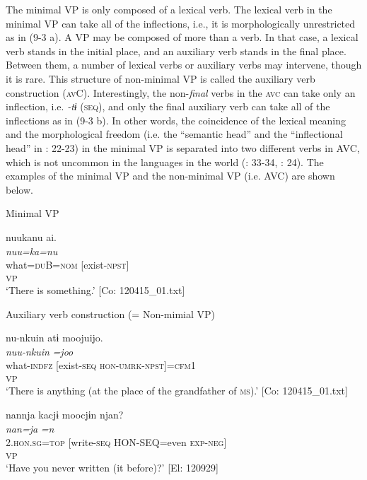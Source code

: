 The minimal VP is only composed of a lexical verb. The lexical verb in the minimal VP can take all of the inflections, i.e., it is morphologically unrestricted as in (9-3 a). A VP may be composed of more than a verb. In that case, a lexical verb stands in the initial place, and an auxiliary verb stands in the final place. Between them, a number of lexical verbs or auxiliary verbs may intervene, though it is rare. This structure of non-minimal VP is called the auxiliary verb construction (\textsc{av}C). Interestingly, the non-\textit{final} verbs in the \textsc{avc} can take only an inflection, i.e. \textit{{}-tɨ} (\textsc{seq}), and only the final auxiliary verb can take all of the inflections as in (9-3 b). In other words, the coincidence of the lexical meaning and the morphological freedom (i.e. the “semantic head” and the “inflectional head” in \citealt{Anderson2006}: 22-23) in the minimal VP is separated into two different verbs in AVC, which is not uncommon in the languages in the world (\citealt{Lehmann1995}: 33-34, \citealt{Anderson2006}: 24). The examples of the minimal VP and the non-minimal VP (i.e. AVC) are shown below.

\ea  \label{ex:9.4}

\exi{} Minimal VP 

\ea %
 \gllll  nuukanu  ai.\\
      \textit{nuu=ka=nu}  \textit{}\\
      what=\textsc{du}B=\textsc{nom}  [exist-\textsc{npst}]\\
        [Lex. V]\textsubscript{VP}\\
      \glt       ‘There is something.’ [Co: 120415\_01.txt]

\exi{}  Auxiliary verb construction (= Non-mimial VP)

\ex \label{ex:.b} %
    \gllll  nu-nkuin  atɨ  moojuijo.\\
      \textit{nuu-nkuin}  \textit{}  \textit{=joo}\\
      what-\textsc{indfz}  [exist-\textsc{seq}  \textsc{hon}-\textsc{umrk}-\textsc{npst}]=\textsc{cfm}1\\
        [Lex. V  Aux. V]\textsubscript{VP}\\
      \glt       ‘There is anything (at the place of the grandfather of \textsc{ms}).’ [Co: 120415\_01.txt]

\ex \label{ex:.c} %
    \gllll  nannja  kacjɨ  moocjɨn  njan?\\
      \textit{nan=ja}  \textit{}  \textit{=n}  \textit{}\\
      2.\textsc{hon}.\textsc{sg}=\textsc{top}  [write-\textsc{seq}  HON-SEQ=even  \textsc{exp}-\textsc{neg}]\\
        [Lex. V  Aux. V  Aux. V]\textsubscript{VP}\\
      \glt       ‘Have you never written (it before)?’ [El: 120929]
    \z
\z

